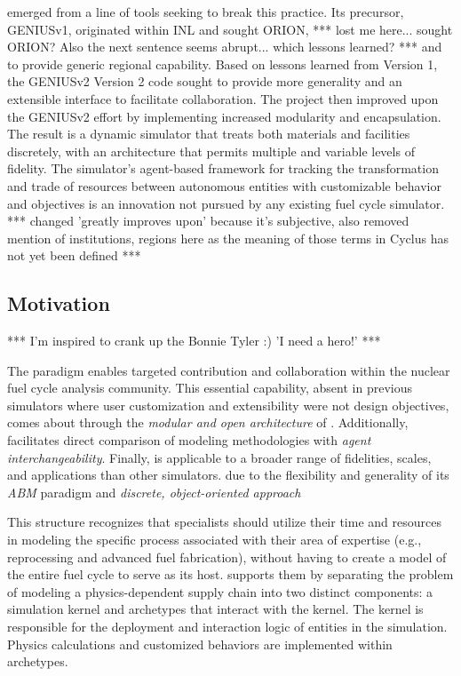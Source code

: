 \Cyclus emerged from a line of tools seeking to break this practice.
Its precursor,
\gls{GENIUSv1}\cite{dunzik-gougar_global_2007,jain_transitioning_2006}, originated within \gls{INL} and sought
\gls{ORION}\cite{}, *** lost me here... sought ORION? Also the next sentence seems abrupt... which lessons learned? ***  and
to provide generic regional capability.  Based on lessons learned from
Version 1, the
\acrshort{GENIUSv2} Version 2\cite{oliver_studying_2009,huff_geniusv2_2009} code sought to
provide more generality and an extensible interface to facilitate
collaboration.  The \Cyclus project then improved upon the \acrshort{GENIUSv2}
effort by implementing increased modularity and encapsulation.  The result is
a dynamic simulator that treats both materials and facilities discretely, with
an architecture that permits multiple and variable levels of
fidelity. The simulator's agent-based framework for tracking the
transformation and trade of resources between autonomous entities with customizable behavior and objectives is an innovation not pursued by any existing fuel cycle simulator.   *** changed 'greatly improves upon' because it's subjective, also removed mention of institutions, regions here as the meaning of those terms in Cyclus has not yet been defined ***

\subsection{Motivation}
*** I'm inspired to crank up the Bonnie Tyler :)  'I need a hero!' ***

The \Cyclus paradigm enables targeted contribution and collaboration within the nuclear fuel cycle analysis community. This essential capability, absent in previous simulators where user customization and extensibility were not design objectives, comes about through the \emph{modular and open architecture} of \Cyclus.
Additionally, \Cyclus facilitates direct comparison of modeling methodologies with
\emph{agent interchangeability}.
Finally, \Cyclus is applicable to a broader range of
fidelities, scales, and applications than other simulators.
due to the flexibility and generality
of its \emph{\gls{ABM}} paradigm and \emph{discrete, object-oriented approach}

This structure recognizes that specialists should utilize their time and resources in
modeling the specific process associated with their area of expertise (e.g., reprocessing and advanced
fuel fabrication), without having to create a model of the entire fuel cycle to serve as its host.
\Cyclus supports them by separating the problem of modeling a
physics-dependent supply chain into two distinct components: a simulation kernel and archetypes that
interact with the kernel. The kernel is responsible for the
deployment and interaction logic of entities in the simulation.  Physics calculations and
customized behaviors are implemented within archetypes.

